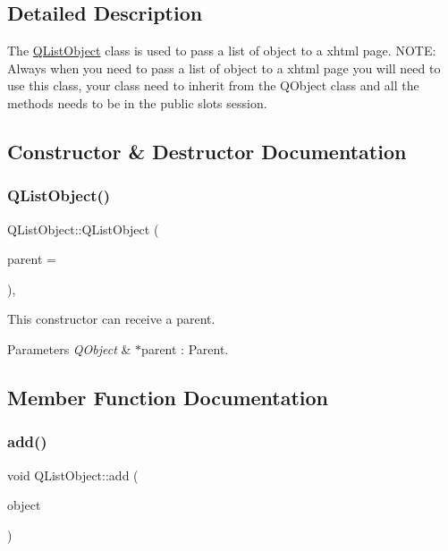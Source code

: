 \subsection{Detailed Description}
The \hyperlink{class_q_list_object}{Q\+List\+Object} class is used to pass a list of object to a xhtml page. N\+O\+TE\+: Always when you need to pass a list of object to a xhtml page you will need to use this class, your class need to inherit from the Q\+Object class and all the methods needs to be in the public slots session. 

\subsection{Constructor \& Destructor Documentation}
\mbox{\label{class_q_list_object_a035ee9dc9f035443995b9419d32b07da}} 
\subsubsection{\texorpdfstring{Q\+List\+Object()}{QListObject()}}
{\footnotesize\ttfamily Q\+List\+Object\+::\+Q\+List\+Object (\begin{DoxyParamCaption}\item[{Q\+Object $\ast$}]{parent = {} }\end{DoxyParamCaption})\hspace{0.3cm}{\ttfamily [inline]}, {\ttfamily [explicit]}}



This constructor can receive a parent. 


\begin{DoxyParams}{Parameters}
{\em Q\+Object} & $\ast$parent \+: Parent. \\
\hline
\end{DoxyParams}


\subsection{Member Function Documentation}
\mbox{\label{class_q_list_object_ad5e960eabd3e9b7d49228ea7549a9bd7}} 
\subsubsection{\texorpdfstring{add()}{add()}}
{\footnotesize\ttfamily void Q\+List\+Object\+::add (\begin{DoxyParamCaption}\item[{Q\+Object $\ast$}]{object }\end{DoxyParamCaption})\hspace{0.3cm}{\ttfamily [inline]}}



